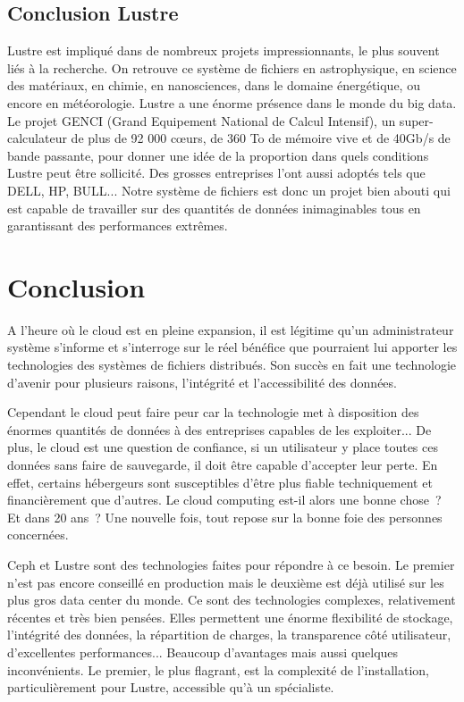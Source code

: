 \documentclass[12pt]{article}
\begin{document}
\subsection{Conclusion Lustre}

Lustre est impliqué dans de nombreux projets impressionnants, le plus souvent liés à la recherche. On retrouve ce système de fichiers en astrophysique, en science des matériaux, en chimie, en nanosciences, dans le domaine énergétique, ou encore en météorologie. Lustre a une énorme présence dans le monde du big data. Le projet GENCI (Grand Equipement National de Calcul Intensif), un super-calculateur de plus de 92 000 cœurs, de 360 To de mémoire vive et de 40Gb/s de bande passante, pour donner une idée de la proportion dans quels conditions Lustre peut être sollicité. Des grosses entreprises l'ont aussi adoptés tels que DELL, HP, BULL... Notre système de fichiers est donc un projet bien abouti qui est capable de travailler sur des quantités de données inimaginables tous en garantissant des performances extrêmes.

\newpage
\section{Conclusion}

A l'heure où le cloud est en pleine expansion, il est légitime qu'un administrateur système s'informe et s’interroge sur le réel bénéfice que pourraient lui apporter les technologies des systèmes de fichiers distribués. Son succès en fait une technologie d'avenir pour plusieurs raisons, l'intégrité et l’accessibilité des données.

Cependant le cloud peut faire peur car la technologie met à disposition des énormes quantités de données à des entreprises capables de les exploiter... De plus, le cloud est une question de confiance, si un utilisateur y place toutes ces données sans faire de sauvegarde, il doit être capable d'accepter leur perte. En effet, certains hébergeurs sont susceptibles d'être plus fiable techniquement et financièrement que d'autres. Le cloud computing est-il alors une bonne chose ? Et dans 20 ans ? Une nouvelle fois, tout repose sur la bonne foie des personnes concernées.

Ceph et Lustre sont des technologies faites pour répondre à ce besoin. Le premier n'est pas encore conseillé en production mais le deuxième est déjà utilisé sur les plus gros data center du monde. Ce sont des technologies complexes, relativement récentes et très bien pensées. Elles permettent une énorme flexibilité de stockage, l'intégrité des données, la répartition de charges, la transparence côté utilisateur, d'excellentes performances... Beaucoup d'avantages mais aussi quelques inconvénients. Le premier, le plus flagrant, est la complexité de l'installation, particulièrement pour Lustre, accessible qu'à un spécialiste.
\end{document}
